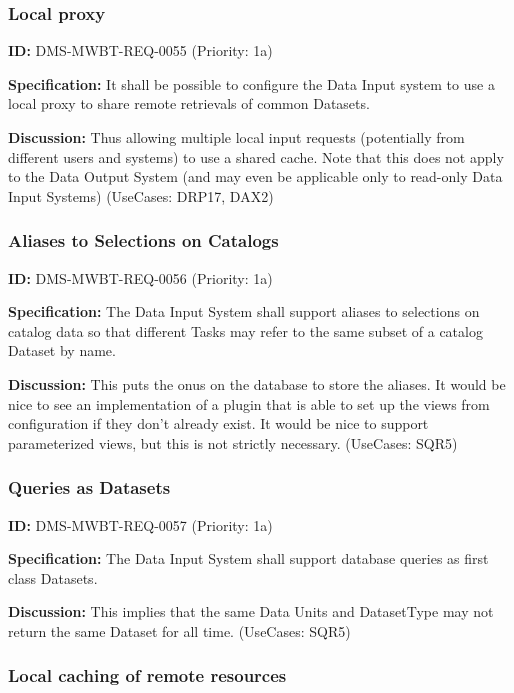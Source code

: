 \documentclass[SE,toc,lsstdraft]{lsstdoc}
\begin{document}
\subsubsection{Local proxy}

\label{DMS-MWBT-REQ-0055}
\textbf{ID:} DMS-MWBT-REQ-0055 (Priority: 1a)

\textbf{Specification:}
It shall be possible to configure the Data Input system to use a local proxy to share remote retrievals of common Datasets.

\textbf{Discussion:}
Thus allowing multiple local input requests (potentially from different users and systems) to use a shared cache. Note that this does not apply to the Data Output System (and may even be applicable only to read-only Data Input Systems) (UseCases: DRP17, DAX2)

\subsubsection{Aliases to Selections on Catalogs}

\label{DMS-MWBT-REQ-0056}
\textbf{ID:} DMS-MWBT-REQ-0056 (Priority: 1a)

\textbf{Specification:}
The Data Input System shall support aliases to selections on catalog data so that different Tasks may refer to the same subset of a catalog Dataset by name.

\textbf{Discussion:}
This puts the onus on the database to store the aliases. It would be nice to see an implementation of a plugin that is able to set up the views from configuration if they don't already exist. It would be nice to support parameterized views, but this is not strictly necessary. (UseCases: SQR5)

\subsubsection{Queries as Datasets}

\label{DMS-MWBT-REQ-0057}
\textbf{ID:} DMS-MWBT-REQ-0057 (Priority: 1a)

\textbf{Specification:}
The Data Input System shall support database queries as first class Datasets.

\textbf{Discussion:}
This implies that the same Data Units and DatasetType may not return the same Dataset for all time. (UseCases: SQR5)

\subsubsection{Local caching of remote resources}
\end{document}
